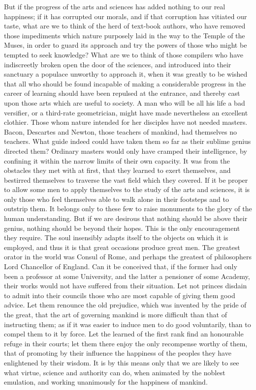 But if the progress of the arts and sciences has added nothing to our
real happiness; if it has corrupted our morals, and if that corruption
has vitiated our taste, what are we to think of the herd of text-book
authors, who have removed those impediments which nature purposely
laid in the way to the Temple of the Muses, in order to guard its
approach and try the powers of those who might be tempted to seek
knowledge? What are we to think of those compilers who have
indiscreetly broken open the door of the sciences, and introduced into
their sanctuary a populace unworthy to approach it, when it was
greatly to be wished that all who should be found incapable of making
a considerable progress in the career of learning should have been
repulsed at the entrance, and thereby cast upon those arts which are
useful to society. A man who will be all his life a bad versifier, or
a third-rate geometrician, might have made nevertheless an excellent
clothier. Those whom nature intended for her disciples have not needed
masters. Bacon, Descartes and Newton, those teachers of mankind, had
themselves no teachers. What guide indeed could have taken them so far
as their sublime genius directed them? Ordinary masters would only
have cramped their intelligence, by confining it within the narrow
limits of their own capacity. It was from the obstacles they met with
at first, that they learned to exert themselves, and bestirred
themselves to traverse the vast field which they covered. If it be
proper to allow some men to apply themselves to the study of the arts
and sciences, it is only those who feel themselves able to walk alone
in their footsteps and to outstrip them. It belongs only to these few
to raise monuments to the glory of the human understanding. But if we
are desirous that nothing should be above their genius, nothing should
be  beyond their hopes. This is the only encouragement they
require. The soul insensibly adapts itself to the objects on which it
is employed, and thus it is that great occasions produce great men.
The greatest orator in the world was Consul of Rome, and perhaps the
greatest of philosophers Lord Chancellor of England. Can it be
conceived that, if the former had only been a professor at some
University, and the latter a pensioner of some Academy, their works
would not have suffered from their situation. Let not princes disdain
to admit into their councils those who are most capable of giving them
good advice. Let them renounce the old prejudice, which was invented
by the pride of the great, that the art of governing mankind is more
difficult than that of instructing them; as if it was easier to induce
men to do good voluntarily, than to compel them to it by force. Let
the learned of the first rank find an honourable refuge in their
courts; let them there enjoy the only recompense worthy of them, that
of promoting by their influence the happiness of the peoples they have
enlightened by their wisdom. It is by this means only that we are
likely to see what virtue, science and authority can do, when animated
by the noblest emulation, and working unanimously for the happiness of
mankind.

